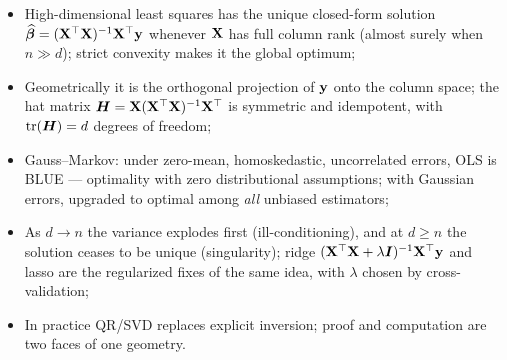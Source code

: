 \begin{keybox}
\begin{itemize}
  \item High-dimensional least squares has the unique closed-form solution $\widehat{\bm{\beta}} = (\mathbf{X}^\top\mathbf{X})^{-1}\mathbf{X}^\top\mathbf{y}$ whenever $\mathbf{X}$ has full column rank (almost surely when $n \gg d$); strict convexity makes it the global optimum;
  \item Geometrically it is the orthogonal projection of $\mathbf{y}$ onto the column space; the hat matrix $\bm{H} = \mathbf{X}(\mathbf{X}^\top\mathbf{X})^{-1}\mathbf{X}^\top$ is symmetric and idempotent, with $\mathrm{tr}(\bm{H}) = d$ degrees of freedom;
  \item Gauss--Markov: under zero-mean, homoskedastic, uncorrelated errors, OLS is BLUE — optimality with zero distributional assumptions; with Gaussian errors, upgraded to optimal among \emph{all} unbiased estimators;
  \item As $d \to n$ the variance explodes first (ill-conditioning), and at $d \ge n$ the solution ceases to be unique (singularity); ridge $(\mathbf{X}^\top\mathbf{X} + \lambda\bm{I})^{-1}\mathbf{X}^\top\mathbf{y}$ and lasso are the regularized fixes of the same idea, with $\lambda$ chosen by cross-validation;
  \item In practice QR/SVD replaces explicit inversion; proof and computation are two faces of one geometry.
\end{itemize}
\end{keybox}
